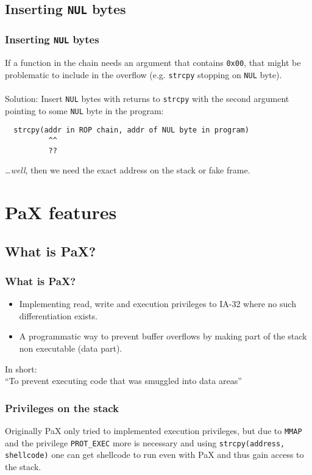 \documentclass[10pt]{beamer}
\begin{document}
\subsection{Inserting \texttt{NUL} bytes}

\begin{frame}[fragile]
  \frametitle{Inserting \texttt{NUL} bytes}

  If a function in the chain needs an argument that contains \texttt{0x00},
  that might be problematic to include in the overflow (e.g. \texttt{strcpy}
  stopping on \texttt{NUL} byte).
  \hfill\\
  \hfill\\

  Solution: Insert \texttt{NUL} bytes with returns to \texttt{strcpy} with the
  second argument pointing to some \texttt{NUL} byte in the program:

  \begin{verbatim}
  strcpy(addr in ROP chain, addr of NUL byte in program)
          ^^
          ??
  \end{verbatim}

  \emph{\dots well}, then we need the exact address on the stack or fake frame.
\end{frame}


\section{PaX features}  %
\subsection{What is PaX?}
\begin{frame}
\frametitle{What is PaX?}
\begin{itemize}
\item Implementing read, write and execution privileges to IA-32 where no
such differentiation exists.
\item A programmatic way to prevent buffer overflows by making part of the stack
non executable (data part).
\end{itemize}
\vspace{4mm}
In short:\\
\vspace{2mm}
\hspace{6mm}``To prevent executing code that was smuggled into data areas''
\end{frame}

\begin{frame}[fragile]
\frametitle{Privileges on the stack}
Originally PaX only tried to implemented execution privileges, but due to
\texttt{MMAP} and the privilege \texttt{PROT\_EXEC} more is necessary and using
\texttt{strcpy(address, shellcode)} one can get shellcode to run even with PaX
and thus gain access to the stack.
\end{frame}
\end{document}
